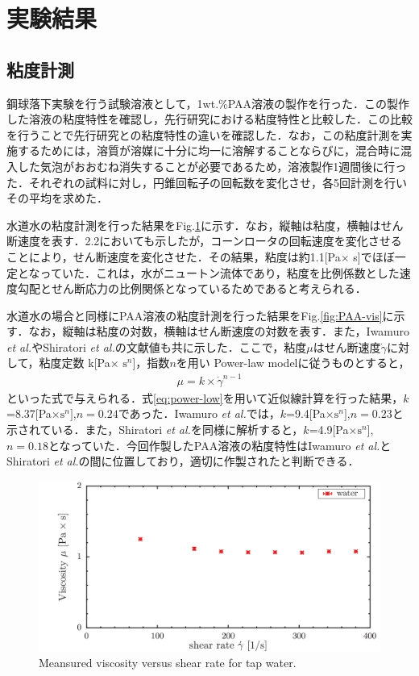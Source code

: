 \section{実験結果}
\subsection{粘度計測}
鋼球落下実験を行う試験溶液として，1wt.\%PAA溶液の製作を行った．この製作した溶液の粘度特性を確認し，先行研究\cite{ref:9}\cite{ref:10}における粘度特性と比較した．この比較を行うことで先行研究との粘度特性の違いを確認した．なお，この粘度計測を実施するためには，溶質が溶媒に十分に均一に溶解することならびに，混合時に混入した気泡がおおむね消失することが必要であるため，溶液製作1週間後に行った．それぞれの試料に対し，円錐回転子の回転数を変化させ，各5回計測を行いその平均を求めた．

水道水の粘度計測を行った結果をFig.\ref{fig:water-vis}に示す．なお，縦軸は粘度，横軸はせん断速度を表す．2.2においても示したが，コーンロータの回転速度を変化させることにより，せん断速度を変化させた．その結果，粘度は約1.1[Pa$\times$ s]でほぼ一定となっていた．これは，水がニュートン流体であり，粘度を比例係数とした速度勾配とせん断応力の比例関係となっているためであると考えられる．

水道水の場合と同様にPAA溶液の粘度計測を行った結果をFig.\ref{fig:PAA-vis}に示す．なお，縦軸は粘度の対数，横軸はせん断速度の対数を表す．また，Iwamuro {\it et al.}\cite{ref:9}やShiratori {\it et al.}\cite{ref:10}の文献値も共に示した．ここで，粘度$\mu$はせん断速度$\dot{\gamma}$に対して，粘度定数 k[Pa$\times$ $\text{s}^n$]，指数$n$を用い Power-law modelに従うものとすると，
\begin{eqnarray}
    \label{eq:power-low}
    \mu=k\times\dot{\gamma}^{n-1}
\end{eqnarray}
といった式で与えられる\cite{ref:1}．式\ref{eq:power-low}を用いて近似線計算を行った結果，$k$=8.37[Pa$\times \text{s}^n]$,$n=0.24$であった．Iwamuro {\it et al.}\cite{ref:9}では，$k$=9.4[Pa$\times \text{s}^n]$,$n=0.23$と示されている．また，Shiratori {\it et al.}\cite{ref:10}を同様に解析すると，$k$=4.9[Pa$\times \text{s}^n$],$n=0.18$となっていた．今回作製したPAA溶液の粘度特性はIwamuro {\it et al.}とShiratori {\it et al.}の間に位置しており，適切に作製されたと判断できる．

\begin{figure}[ht]
    \centering
    \includegraphics[width=12cm,clip]{4-Results/water.png}
    \caption{Meansured viscosity versus shear rate for tap water.}
    \label{fig:water-vis}
\end{figure}

